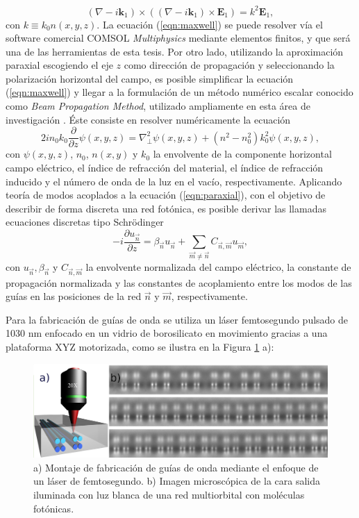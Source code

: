 \documentclass{article}
\begin{document}
\begin{equation}
	(\nabla-i\textbf{k}_1)\times((\nabla-i\textbf{k}_1)\times \textbf{E}_1) = k^2 \textbf{E}_1,
	 \label{eqn:maxwell}
\end{equation}
con $k \equiv k_0 n(x,y,z)$.
La ecuación (\ref{eqn:maxwell}) se puede resolver vía el software comercial COMSOL \textit{Multiphysics} mediante elementos finitos, y que será una de las herramientas de esta tesis. Por otro lado, utilizando la aproximación paraxial escogiendo el eje $z$  como dirección de propagación y seleccionando la polarización horizontal del campo, es posible simplificar la ecuación (\ref{eqn:maxwell}) y llegar a la formulación de un método numérico escalar conocido como \textit{Beam Propagation Method}, utilizado ampliamente en esta área de investigación \cite{bics, interorbital, OAMCaging, vortex, bpm}. Éste consiste en resolver numéricamente la ecuación
\begin{equation}
	2in_0k_0\frac{\partial}{\partial z}\psi(x,y,z) = \nabla_\perp^2 \psi (x,y,z) + \left(n^2-n_0^2\right)k_0^2 \psi (x,y,z), \label{eqn:paraxial}
\end{equation}
con $\psi(x,y,z)$, $n_0$, $n(x,y)$ y $k_0$ la envolvente de la componente horizontal campo eléctrico, el índice de refracción del material, el índice de refracción inducido y el número de onda de la luz en el vacío, respectivamente. Aplicando teoría de modos acoplados \cite{coupledmodetheory} a la ecuación (\ref{eqn:paraxial}), con el objetivo de describir de forma discreta una red fotónica, es posible derivar las llamadas ecuaciones discretas tipo Schrödinger \cite{discretesolitons, artificialFB, FBdynamics}
\begin{equation}
	-i\frac{\partial u_{\vec{n}} }{\partial z} = \beta_{\vec{n}}u_{\vec{n}} + \sum_{\vec{m}\neq\vec{n}} C_{\vec{n},\vec{m}}u_{\vec{m}}, \label{eqn:CMT}
\end{equation}
con $u_{\vec{n}}, \beta_{\vec{n}}$ y $C_{\vec{n}, \vec{m}}$ la envolvente normalizada del campo eléctrico, la constante de propagación normalizada y las constantes de acoplamiento entre los modos de las guías en las posiciones de la red $\vec{n}$ y $\vec{m}$, respectivamente.


Para la fabricación de guías de onda se utiliza un láser femtosegundo pulsado de 1030 nm enfocado en un vidrio de borosilicato en movimiento gracias a una plataforma XYZ motorizada, como se ilustra en la Figura \ref{fig:femtosetup} a): 

\begin{figure}[H]
	\centering
	\includegraphics[width=0.7\linewidth]{./media/femtosetup.png}
	\caption{a) Montaje de fabricación de guías de onda mediante el enfoque de un láser de femtosegundo. b) Imagen microscópica de la cara salida iluminada con luz blanca de una red multiorbital con moléculas fotónicas. \label{fig:femtosetup}}
\end{figure}
\end{document}
